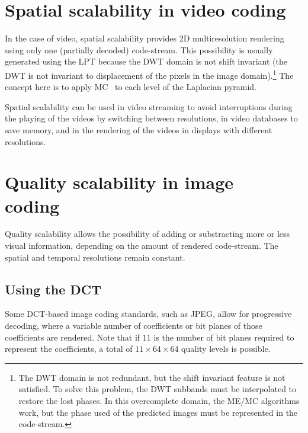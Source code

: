 
\section{Spatial scalability in video coding~\cite{vruiz__video_scalability}}


In the case of video, spatial scalability provides 2D multiresolution
rendering using only one (partially decoded) code-stream. This
possibility is usually generated using the LPT because the DWT domain
is not shift invariant (the DWT is not invariant to displacement of
the pixels in the image domain).\footnote{The DWT domain is not
  redundant, but the shift invariant feature is not satisfied. To
  solve this problem, the DWT subbands must be interpolated to restore
  the lost phases. In this overcomplete domain, the ME/MC algorithms
  work, but the phase used of the predicted images must be represented
  in the code-stream.} The concept here is to apply
MC~\cite{vruiz__MC} to each level of the Laplacian pyramid.

Spatial scalability can be used in video streaming to avoid
interruptions during the playing of the videos by switching between
resolutions, in video databases to save memory, and in the rendering
of the videos in displays with different resolutions.


\section{Quality scalability in image coding~\cite{vruiz__JPEG2000}}


Quality scalability allows the possibility of adding or substracting
more or less visual information, depending on the amount of rendered
code-stream. The spatial and temporal resolutions remain constant.

\subsection{Using the DCT}

Some DCT-based image coding standards, such as JPEG, allow for
progressive decoding, where a variable number of coefficients or
bit planes of those coefficients are rendered. Note that if $11$ is
the number of bit planes required to represent the coefficients, a
total of $11\times 64\times 64$ quality levels is possible.

